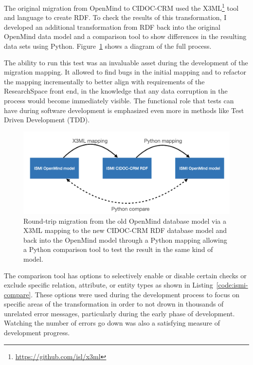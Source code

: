 \documentclass[final]{anthology-ch} %
\begin{document}
The original migration from OpenMind to CIDOC-CRM used the X3ML\footnote{\url{https://github.com/isl/x3ml}} tool and language to create RDF. To check the results of this transformation, I developed an additional transformation from RDF back into the original OpenMind data model and a comparison tool to show differences in the resulting data sets using Python. Figure~\ref{fig:ismi-round-trip} shows a diagram of the full process.

The ability to run this test was an invaluable asset during the development of the migration mapping. It allowed to find bugs in the initial mapping and to refactor the mapping incrementally to better align with requirements of the ResearchSpace front end, in the knowledge that any data corruption in the process would become immediately visible. The functional role that tests can have during software development is emphasized even more in methods like Test Driven Development (TDD).

\begin{figure}[]
  \centering
  \includegraphics[width=0.8\linewidth]{figures/ismi-round-trip.png}
  \caption{Round-trip migration from the old OpenMind database model via a X3ML mapping to the new CIDOC-CRM RDF database model and back into the OpenMind model through a Python mapping allowing a Python comparison tool to test the result in the same kind of model.}
  \label{fig:ismi-round-trip}
\end{figure}

The comparison tool has options to selectively enable or disable certain checks or exclude specific relation, attribute, or entity types as shown in Listing~\ref{code:ismi-compare}. These options were used during the development process to focus on specific areas of the transformation in order to not drown in thousands of unrelated error messages, particularly during the early phase of development. Watching the number of errors go down was also a satisfying measure of development progress.
\end{document}
